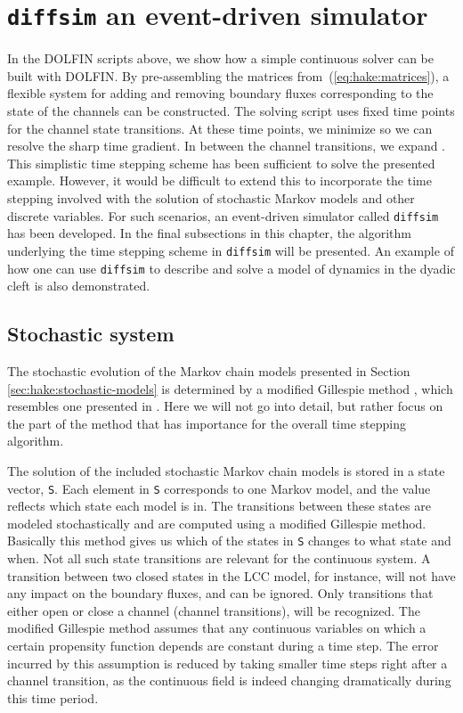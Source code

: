\section{\texttt{diffsim} an event-driven simulator}
\label{sec:hake:diffsim}
   In
the DOLFIN scripts above, we show how a simple continuous solver can
be built with DOLFIN. By pre-assembling the matrices
from~(\ref{eq:hake:matrices}), a flexible system for adding and
removing boundary fluxes corresponding to the state of the channels
can be constructed. The solving script uses fixed time points for the
channel state transitions. At these time points, we minimize \Dt so we
can resolve the sharp time gradient. In between the channel
transitions, we expand \Dt. This simplistic time stepping scheme has
been sufficient to solve the presented example. However, it would be
difficult to extend this to incorporate the time stepping involved
with the solution of stochastic Markov models and other discrete
variables. For such scenarios, an event-driven simulator called
\texttt{diffsim} has been developed. In the final subsections in this
chapter, the algorithm underlying the time stepping scheme in
\texttt{diffsim} will be presented. An example of how one can use
\texttt{diffsim} to describe and solve a model of \Ca dynamics in the
dyadic cleft is also demonstrated.

\subsection{Stochastic system}

\label{sec:hake:stochastic-system}
    The stochastic evolution of the
Markov chain models presented in Section
\ref{sec:hake:stochastic-models} is determined by a modified Gillespie
method \citep{Gillespie1977}, which resembles one presented in
\citet{RudigerShuaiHuisingaEtAl2007}. Here we will not go into detail,
but rather focus on the part of the method that has importance for the
overall time stepping algorithm.

The solution of the included stochastic Markov chain models is stored
in a state vector, \texttt{S}. Each element in \texttt{S} corresponds
to one Markov model, and the value reflects which state each model is
in. The transitions between these states are modeled stochastically
and are computed using a modified Gillespie method. Basically this
method gives us which of the states in \texttt{S} changes to what
state and when. Not all such state transitions are relevant for the
continuous system. A transition between two closed states in the LCC
model, for instance, will not have any impact on the boundary fluxes,
and can be ignored. Only transitions that either open or close a
channel (channel transitions), will be recognized. The modified
Gillespie method assumes that any continuous variables on which a
certain propensity function depends are constant during a time
step. The error incurred by this assumption is reduced by taking
smaller time steps right after a channel transition, as the continuous
field is indeed changing dramatically during this time period.

